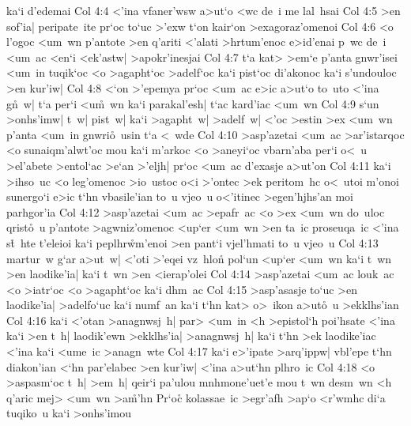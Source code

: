 ka`i
d'edemai\bibvsend
\vs Col 4:4
<'ina
vfaner'wsw
a>ut`o
<wc
de~i
me
lal~hsai\bibvsend
\vs Col 4:5
>en
sof'ia|
peripate~ite
pr`oc
to`uc
>'exw
t`on
kair`on
>exagoraz'omenoi\bibvsend
\vs Col 4:6
<o
l'ogoc
<um~wn
p'antote
>en
q'ariti
<'alati
>hrtum'enoc
e>id'enai
p~wc
de~i
<um~ac
<en`i
<ek'astw|
>apokr'inesjai\bibvsend
\vs Col 4:7
t`a
kat>
>em`e
p'anta
gnwr'isei
<um~in
tuqik`oc
<o
>agapht`oc
>adelf`oc
ka`i
pist`oc
di'akonoc
ka`i
s'undouloc
>en
kur'iw|\bibvsend
\vs Col 4:8
<`on
>'epemya
pr`oc
<um~ac
e>ic
a>ut`o
to~uto
<'ina
g\r{n}~w|
t`a
per`i
<u\r{m}~wn
ka`i
parakal'esh|
t`ac
kard'iac
<um~wn\bibvsend
\vs Col 4:9
s`un
>onhs'imw|
t~w|
pist~w|
ka`i
>agapht~w|
>adelf~w|
<'oc
>estin
>ex
<um~wn
p'anta
<um~in
gnwri\r{o}~usin
t`a
<~wde\bibvsend
\vs Col 4:10
>asp'azetai
<um~ac
>ar'istarqoc
<o
sunaiqm'alwt'oc
mou
ka`i
m'arkoc
<o
>aneyi`oc
vbarn'aba
per`i
o<~u
>el'abete
>entol`ac
>e`an
>'eljh|
pr`oc
<um~ac
d'exasje
a>ut'on\bibvsend
\vs Col 4:11
ka`i
>ihso~uc
<o
leg'omenoc
>io~ustoc
o<i
>'ontec
>ek
peritom~hc
o<~utoi
m'onoi
sunergo`i
e>ic
t`hn
vbasile'ian
to~u
vjeo~u
o<'itinec
>egen'hjhs'an
moi
parhgor'ia\bibvsend
\vs Col 4:12
>asp'azetai
<um~ac
>epafr~ac
<o
>ex
<um~wn
do~uloc
qrist\r{o}~u
p'antote
>agwniz'omenoc
<up`er
<um~wn
>en
ta~ic
proseuqa~ic
<'ina
s\r{t}~hte
t'eleioi
ka`i
peplhr\r{w}m'enoi
>en
pant`i
vjel'hmati
to~u
vjeo~u\bibvsend
\vs Col 4:13
martur~w
g`ar
a>ut~w|
<'oti
>'eqei
vz~hlon\r{}
pol`un
<up`er
<um~wn
ka`i
t~wn
>en
laodike'ia|
ka`i
t~wn
>en
<ierap'olei\bibvsend
\vs Col 4:14
>asp'azetai
<um~ac
louk~ac
<o
>iatr`oc
<o
>agapht`oc
ka`i
dhm~ac\bibvsend
\vs Col 4:15
>asp'asasje
to`uc
>en
laodike'ia|
>adelfo`uc
ka`i
numf~an
ka`i
t`hn
kat>
o>~ikon
a>ut\r{o}~u
>ekklhs'ian\bibvsend
\vs Col 4:16
ka`i
<'otan
>anagnwsj~h|
par>
<um~in
<h
>epistol`h
poi'hsate
<'ina
ka`i
>en
t~h|
laodik'ewn
>ekklhs'ia|
>anagnwsj~h|
ka`i
t`hn
>ek
laodike'iac
<'ina
ka`i
<ume~ic
>anagn~wte\bibvsend
\vs Col 4:17
ka`i
e>'ipate
>arq'ippw|
vbl'epe
t`hn
diakon'ian
<`hn
par'elabec
>en
kur'iw|
<'ina
a>ut`hn
plhro~ic\bibvsend
\vs Col 4:18
<o
>aspasm`oc
t~h|
>em~h|
qeir`i
pa'ulou
mnhmone'uet'e
mou
t~wn
desm~wn
<h
q'aric
mej>
<um~wn
>a\r{m}'hn\bibvsend
{}
Pr`oc\r{}
kolassae~ic
>egr'afh
>ap`o
<r'wmhc
di`a
tuqiko~u
ka`i
>onhs'imou\bibvsend
